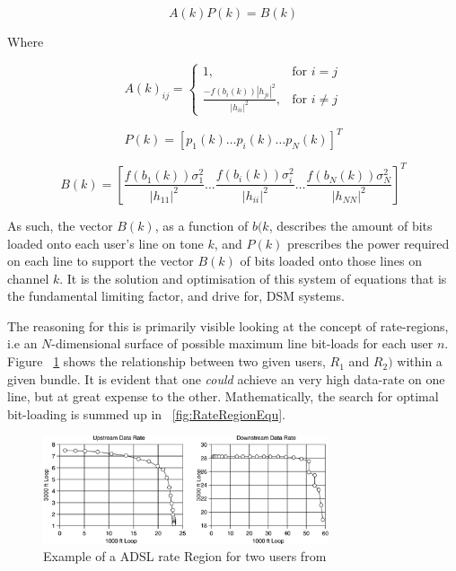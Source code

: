 \begin{equation}\label{eq:SysModMat}
A(k)P(k)=B(k)
\end{equation}

Where

\begin{equation}\label{eq:SysModA}
A(k)_{ij}=\begin{cases} 1, & \mbox{for } i = j \\\frac{-f(b_i(k))|h_{ji}|^2}{|h_{ii}|^2}, & \mbox{for } i \neq j \end{cases}
\end{equation}

\begin{equation}\label{eq:SysModP}
P(k)=[p_1(k) \dots p_i(k) \dots p_N(k)]^T
\end{equation}

\begin{equation}\label{eq:SysModB}
B(k)=\left[\frac{f(b_1(k)) \sigma^2_1}{|h_{11}|^2} \dots \frac{f(b_i(k)) \sigma^2_i}{|h_{ii}|^2} \dots \frac{f(b_N(k))\sigma^2_N}{|h_{NN}|^2}\right]^T
\end{equation}

As such, the vector \(B(k)\), as a function of \(b(k\), describes the amount of bits loaded onto each user's line on tone \(k\), and \(P(k)\) prescribes the power required on each line to support the vector \(B(k)\) of bits loaded onto those lines on channel \(k\). It is the solution and optimisation of this system of equations that is the fundamental limiting factor, and drive for, DSM systems. 

The reasoning for this is primarily visible looking at the concept of rate-regions, i.e an \(N\)-dimensional surface of possible maximum line bit-loads for each user \(n\). Figure ~\ref{fig:RateRegionExample} shows the relationship between two given users, \(R_1\) and \(R_2)\) within a given bundle. It is evident that one \emph{could} achieve an very high data-rate on one line, but at great expense to the other. Mathematically, the search for optimal bit-loading is summed up in ~\eqref{fig:RateRegionEqu}.

\begin{figure}[h!]
  \centering
  \includegraphics[width=0.75\textwidth]{images/rateregion.png}
  \caption{Example of a ADSL rate Region for two users from \cite{TS03}}
  \label{fig:RateRegionExample}
\end{figure}

